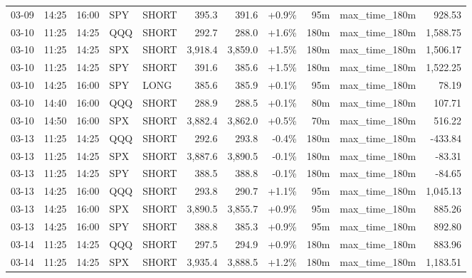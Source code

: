 \documentclass[11pt,a4paper,twoside]{article}
\begin{document}
\begin{center}
\begin{longtable}{>{\color{txtmain}}l l l l l r r r r >{\color{txtmain}}l r}
03-09 & 14:25 & 16:00 & SPY & SHORT & 395.3 & 391.6 & \textcolor{wingreen}{+0.9\%} & 95m & max\_time\_180m & \textcolor{wingreen}{928.53} \\
03-10 & 11:25 & 14:25 & QQQ & SHORT & 292.7 & 288.0 & \textcolor{wingreen}{+1.6\%} & 180m & max\_time\_180m & \textcolor{wingreen}{1,588.75} \\
03-10 & 11:25 & 14:25 & SPX & SHORT & 3,918.4 & 3,859.0 & \textcolor{wingreen}{+1.5\%} & 180m & max\_time\_180m & \textcolor{wingreen}{1,506.17} \\
03-10 & 11:25 & 14:25 & SPY & SHORT & 391.6 & 385.6 & \textcolor{wingreen}{+1.5\%} & 180m & max\_time\_180m & \textcolor{wingreen}{1,522.25} \\
03-10 & 14:25 & 16:00 & SPY & LONG & 385.6 & 385.9 & \textcolor{wingreen}{+0.1\%} & 95m & max\_time\_180m & \textcolor{wingreen}{78.19} \\
03-10 & 14:40 & 16:00 & QQQ & SHORT & 288.9 & 288.5 & \textcolor{wingreen}{+0.1\%} & 80m & max\_time\_180m & \textcolor{wingreen}{107.71} \\
03-10 & 14:50 & 16:00 & SPX & SHORT & 3,882.4 & 3,862.0 & \textcolor{wingreen}{+0.5\%} & 70m & max\_time\_180m & \textcolor{wingreen}{516.22} \\
03-13 & 11:25 & 14:25 & QQQ & SHORT & 292.6 & 293.8 & \textcolor{lossred}{-0.4\%} & 180m & max\_time\_180m & \textcolor{lossred}{-433.84} \\
03-13 & 11:25 & 14:25 & SPX & SHORT & 3,887.6 & 3,890.5 & \textcolor{lossred}{-0.1\%} & 180m & max\_time\_180m & \textcolor{lossred}{-83.31} \\
03-13 & 11:25 & 14:25 & SPY & SHORT & 388.5 & 388.8 & \textcolor{lossred}{-0.1\%} & 180m & max\_time\_180m & \textcolor{lossred}{-84.65} \\
03-13 & 14:25 & 16:00 & QQQ & SHORT & 293.8 & 290.7 & \textcolor{wingreen}{+1.1\%} & 95m & max\_time\_180m & \textcolor{wingreen}{1,045.13} \\
03-13 & 14:25 & 16:00 & SPX & SHORT & 3,890.5 & 3,855.7 & \textcolor{wingreen}{+0.9\%} & 95m & max\_time\_180m & \textcolor{wingreen}{885.26} \\
03-13 & 14:25 & 16:00 & SPY & SHORT & 388.8 & 385.3 & \textcolor{wingreen}{+0.9\%} & 95m & max\_time\_180m & \textcolor{wingreen}{892.80} \\
03-14 & 11:25 & 14:25 & QQQ & SHORT & 297.5 & 294.9 & \textcolor{wingreen}{+0.9\%} & 180m & max\_time\_180m & \textcolor{wingreen}{883.96} \\
03-14 & 11:25 & 14:25 & SPX & SHORT & 3,935.4 & 3,888.5 & \textcolor{wingreen}{+1.2\%} & 180m & max\_time\_180m & \textcolor{wingreen}{1,183.51} \\

\end{longtable}
\end{center}
\end{document}

